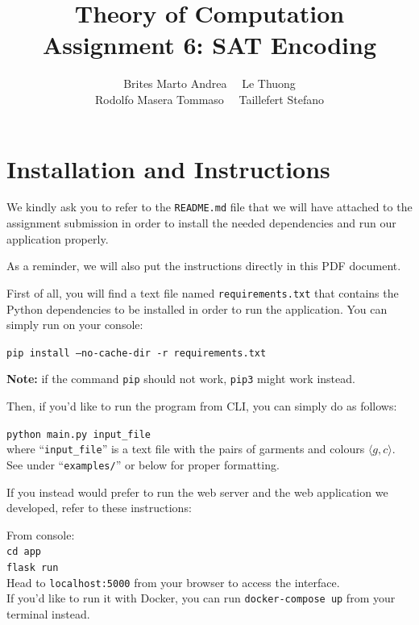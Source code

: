 \documentclass[12pt]{article}
\title{Theory of Computation \\ Assignment 6: SAT Encoding}
\author{Brites Marto Andrea \ \ Le Thuong \\ Rodolfo Masera Tommaso \ \ Taillefert Stefano}
\date{}
\begin{document}
\maketitle

\section{Installation and Instructions}

We kindly ask you to refer to the \texttt{README.md} file that we will have attached to the assignment submission in order to install the needed dependencies and run our application properly.

As a reminder, we will also put the instructions directly in this PDF document.

First of all, you will find a text file named \texttt{requirements.txt} that contains the Python dependencies to be installed in order to run the application. You can simply run on your console:\\

\begin{center}
	\texttt{pip install --no-cache-dir -r requirements.txt}\\
	\begin{small}
		\textbf{Note:} if the command \texttt{pip} should not work, \texttt{pip3} might work instead.
	\end{small}
\end{center}

Then, if you'd like to run the program from CLI, you can simply do as follows:

\begin{center}
	\texttt{python main.py input\_file}\\

	where ``\texttt{input\_file}'' is a text file with the pairs of garments and colours $\langle g, c \rangle$. See under ``\texttt{examples/}'' or below for proper formatting.
\end{center}

If you instead would prefer to run the web server and the web application we developed, refer to these instructions:

\begin{center}
	From console: \\
	\texttt{cd app}\\
	\texttt{flask run}\\
	Head to \texttt{localhost:5000} from your browser to access the interface.\\
	If you'd like to run it with Docker, you can run \texttt{docker-compose up} from your terminal instead.
\end{center}
\end{document}
